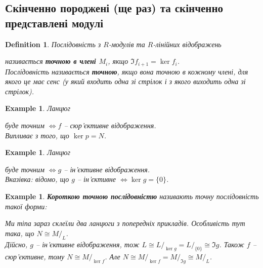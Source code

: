 \documentclass[a4paper, 10pt]{article}
\theoremstyle{theoremdd}
\theoremstyle{theoremdd}
\newtheorem{definition}[theorem]{Definition}
\theoremstyle{theoremdd}
\theoremstyle{theoremdd}
\theoremstyle{theoremdd}
\newtheorem{example}[theorem]{Example}
\theoremstyle{theoremdd}
\theoremstyle{theoremdd}
\theoremstyle{theoremdd}
\theoremstyle{theoremdd}
\theoremstyle{theoremdd}
\theoremstyle{theoremdd}
\theoremstyle{theoremdd}
\theoremstyle{theoremdd}
\theoremstyle{theoremdd}
\theoremstyle{theoremdd}
\begin{document}
\subsection{Скінченно породжені (ще раз) та скінченно представлені модулі}
\begin{definition}
Послідовність з $R$-модулів та $R$-лінійних відображень
\begin{figure}[H]
\centering
{}
\end{figure}
називається \textbf{точною в члені $M_i$}, якщо $\Im f_{i+1} = \ker f_i$.\\
Послідовність називається \textbf{точною}, якщо вона  точною в кожному члені, для якого це має сенс (у який входить одна зі стрілок і з якого виходить одна зі стрілок).
\end{definition}

\begin{example}
\label{chain_for_surjective_map}
Ланцюг  буде точним $\iff f$ -- сюр'єктивне відображення.\\
\textit{Випливає з того, що $\ker p = N$.}
\end{example}

\begin{example}
\label{chain_for_injective_map}
Ланцюг  буде точним $\iff g$ -- ін'єктивне відображення.\\
\textit{Вказівка: відомо, що $g$ -- ін'єктивне $\iff \ker g = \{0\}$.}
\end{example}

\begin{example}
\textbf{Короткою точною послідовністю} називають точну послідовність такої форми:
\begin{figure}[H]
\centering
{}
\end{figure}
Ми тіпа зараз склеїли два ланцюги з попередніх прикладів. Особливість тут така, що $N \cong M/_L$.\\
Дійсно, $g$ -- ін'єктивне відображення, тож $L \cong L/_{\ker g} = L/_{\{0\}} \cong \Im g$. Також $f$ -- сюр'єктивне, тому $N \cong M/_{\ker f}$. Але $N \cong M/_{\ker f} = M/_{\Im g} \cong M/_L$.
\end{example}
\end{document}
